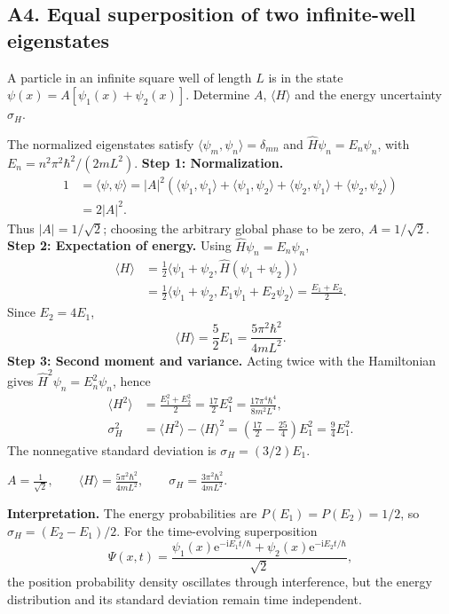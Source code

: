 \documentclass[11pt,a4paper]{article}
\newcommand{\key}[1]{\begin{resultbox}\centering\(\displaystyle #1\)\end{resultbox}}
\newcommand{\iu}{\mathrm{i}}
\newcommand{\ee}{\mathrm{e}}
\newcommand{\abs}[1]{\left|#1\right|}
\begin{document}
\subsection{A4. Equal superposition of two infinite-well eigenstates}
\begin{questionbox}
A particle in an infinite square well of length $L$ is in the state $\psi(x)=A[\psi_1(x)+\psi_2(x)]$. Determine $A$, $\langle H\rangle$ and the energy uncertainty $\sigma_H$.
\end{questionbox}
The normalized eigenstates satisfy $\langle\psi_m,\psi_n\rangle=\delta_{mn}$ and $\hat H\psi_n=E_n\psi_n$, with $E_n=n^2\pi^2\hbar^2/(2mL^2)$.
\textbf{Step 1: Normalization.}
\begin{align}
1&=\langle\psi,\psi\rangle
=\abs A^2\left(\langle\psi_1,\psi_1\rangle+\langle\psi_1,\psi_2\rangle+\langle\psi_2,\psi_1\rangle+\langle\psi_2,\psi_2\rangle\right)\\
&=2\abs A^2.
\end{align}
Thus $\abs A=1/\sqrt2$; choosing the arbitrary global phase to be zero, $A=1/\sqrt2$.
\textbf{Step 2: Expectation of energy.} Using $\hat H\psi_n=E_n\psi_n$,
\begin{align}
\langle H\rangle&=\frac12\langle\psi_1+\psi_2,\hat H(\psi_1+\psi_2)\rangle\\
&=\frac12\langle\psi_1+\psi_2,E_1\psi_1+E_2\psi_2\rangle=\frac{E_1+E_2}{2}.
\end{align}
Since $E_2=4E_1$,
\begin{equation}\boxed{\langle H\rangle=\frac52E_1=\frac{5\pi^2\hbar^2}{4mL^2}.}\end{equation}
\textbf{Step 3: Second moment and variance.} Acting twice with the Hamiltonian gives $\hat H^2\psi_n=E_n^2\psi_n$, hence
\begin{align}
\langle H^2\rangle&=\frac{E_1^2+E_2^2}{2}=\frac{17}{2}E_1^2=\frac{17\pi^4\hbar^4}{8m^2L^4},\\
\sigma_H^2&=\langle H^2\rangle-\langle H\rangle^2=\left(\frac{17}{2}-\frac{25}{4}\right)E_1^2=\frac94E_1^2.
\end{align}
The nonnegative standard deviation is $\sigma_H=(3/2)E_1$.
\key{\boxed{A=\frac1{\sqrt2},\qquad\langle H\rangle=\frac{5\pi^2\hbar^2}{4mL^2},\qquad\sigma_H=\frac{3\pi^2\hbar^2}{4mL^2}.}}
\textbf{Interpretation.} The energy probabilities are $P(E_1)=P(E_2)=1/2$, so $\sigma_H=(E_2-E_1)/2$. For the time-evolving superposition
\begin{equation}
\Psi(x,t)=\frac{\psi_1(x)\ee^{-\iu E_1t/\hbar}+\psi_2(x)\ee^{-\iu E_2t/\hbar}}{\sqrt2},
\end{equation}
the position probability density oscillates through interference, but the energy distribution and its standard deviation remain time independent.
\end{document}
